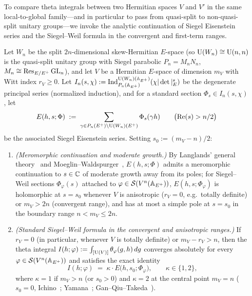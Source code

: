 To compare theta integrals between two Hermitian spaces $V$ and $V'$ in the same local-to-global family—and in particular to pass from quasi-split to non-quasi-split unitary groups—we invoke the analytic continuation of Siegel Eisenstein series and the Siegel--Weil formula in the convergent and first-term ranges.

\begin{proposition}
\label{prop:11:eis-sw}
Let $W_n$ be the split $2n$-dimensional skew-Hermitian $E$-space (so $\mathrm{U}(W_n) \cong \mathrm{U}(n, n)$ is the quasi-split unitary group with Siegel parabolic $P_n = M_n N_n$, $M_n \cong \operatorname{Res}_{E/E^+}\mathrm{GL}_n$), and let $V$ be a Hermitian $E$-space of dimension $m_V$ with Witt index $r_V \ge 0$. Let $I_n(s, \chi) := \mathrm{Ind}_{P_n(\mathbb{A}_{E^+})}^{\mathrm{U}(W_n)(\mathbb{A}_{E^+})}(\chi |\det|_E^s)$ be the degenerate principal series (normalized induction), and for a standard section $\Phi_s \in I_n(s, \chi)$, let
\[
  E(h, s; \Phi) \;:=\; \sum_{\gamma \in P_n(E^+) \backslash \mathrm{U}(W_n)(E^+)} \Phi_s(\gamma h) \qquad \bigl(\operatorname{Re}(s) > n/2\bigr)
\]
be the associated Siegel Eisenstein series. Setting $s_0 := (m_V - n)/2$:
\begin{enumerate}[label=\textup{(\roman*)}]
\item \emph{(Meromorphic continuation and moderate growth.)} By Langlands' general theory~\cite{Langlands1976} and Moeglin--Waldspurger~\cite{MoeglinWaldspurger1995}, $E(h, s; \Phi)$ admits a meromorphic continuation to $s \in \mathbb{C}$ of moderate growth away from its poles; for Siegel--Weil sections $\Phi_\varphi(s)$ attached to $\varphi \in \mathcal{S}(V^n(\mathbb{A}_{E^+}))$, $E(h, s; \Phi_\varphi)$ is holomorphic at $s = s_0$ whenever $V$ is anisotropic ($r_V = 0$, e.g.\ totally definite) or $m_V > 2n$ (convergent range), and has at most a simple pole at $s = s_0$ in the boundary range $n < m_V \le 2n$.
\item \emph{(Standard Siegel--Weil formula in the convergent and anisotropic ranges.)} If $r_V = 0$ (in particular, whenever $V$ is totally definite) or $m_V - r_V > n$, then the theta integral $I(h; \varphi) := \int_{[\mathrm{U}(V)]} \theta_\varphi(g, h)\, dg$ converges absolutely for every $\varphi \in \mathcal{S}(V^n(\mathbb{A}_{E^+}))$ and satisfies the exact identity
  \begin{equation}
  \label{eq:11:sw-std}
    I(h; \varphi) \;=\; \kappa \cdot E\bigl(h, s_0; \Phi_\varphi\bigr),
    \qquad \kappa \in \{1, 2\},
  \end{equation}
  where $\kappa = 1$ if $m_V > n$ (or $s_0 > 0$) and $\kappa = 2$ at the central point $m_V = n$ ($s_0 = 0$, Ichino~\cite{Ichino2004,Ichino2007}; Yamana~\cite{Yamana2013}; Gan--Qiu--Takeda~\cite{GanQiuTakeda2014}).

\end{enumerate}
\end{proposition}
